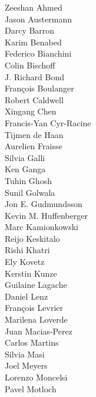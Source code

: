 \documentclass[PICOReport.tex]{subfiles}
\begin{document}
\footnotesize {

\begin{multicols}{4}
Zeeshan Ahmed                   \\
Jason Austermann                \\
Darcy Barron                    \\
Karim Benabed                   \\
Federico Bianchini              \\
Colin Bischoff                  \\
J. Richard Bond                 \\
Fran\c{c}ois Boulanger          \\
Robert Caldwell                 \\
Xingang Chen                    \\
Francis-Yan Cyr-Racine          \\
Tijmen de Haan                  \\
Aurelien Fraisse                \\
Silvia Galli                    \\
Ken Ganga                       \\
Tuhin Ghosh                     \\
Sunil Golwala                   \\
Jon E. Gudmundsson              \\
Kevin M. Huffenberger           \\
Marc Kamionkowski               \\
Reijo Keskitalo                 \\
Rishi Khatri                    \\
Ely Kovetz                      \\
Kerstin Kunze                   \\
Guilaine Lagache                \\
Daniel Lenz                     \\
Fran\c{c}ois Levrier            \\
Marilena Loverde                \\
Juan Macias-Perez               \\
Carlos Martins                  \\
Silvia Masi                     \\
Joel Meyers                     \\
Lorenzo Moncelsi                \\
Pavel Motloch                   \\

\end{multicols}}
\end{document}
